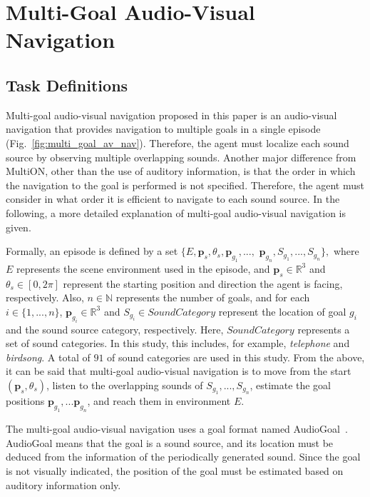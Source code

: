 \section{Multi-Goal Audio-Visual Navigation}

\subsection{Task Definitions}


Multi-goal audio-visual navigation proposed in this paper is an audio-visual navigation that provides navigation to multiple goals in a single episode (Fig.~\ref{fig:multi_goal_av_nav}).
Therefore, the agent must localize each sound source by observing multiple overlapping sounds.
Another major difference from MultiON, other than the use of auditory information, is that the order in which the navigation to the goal is performed is not specified.
Therefore, the agent must consider in what order it is efficient to navigate to each sound source.
In the following, a more detailed explanation of multi-goal audio-visual navigation is given.

Formally, an episode is defined by a set
$
\{E, \bm{p}_s, \theta_s, \bm{p}_{g_1}, ... , 
$
$
\bm{p}_{g_n}, S_{g_1}, ... , S_{g_n}\},
$
where $E$ represents the scene environment used in the episode, and $\bm{p}_s \in \mathbb{R}^3$ and $\theta_s \in [0, 2\pi]$ represent the starting position and direction the agent is facing, respectively.
Also, $n \in \mathbb{N}$ represents the number of goals, and for each $i \in \{1, ... , n\}$, $\bm{p}_{g_i} \in \mathbb{R}^3$ and $S_{g_i} \in SoundCategory$ represent the location of goal $g_i$ and the sound source category, respectively.
Here, $SoundCategory$ represents a set of sound categories. 
In this study, this includes, for example, \textit{telephone} and \textit{birdsong}.
A total of $91$ of sound categories are used in this study.
From the above, it can be said that multi-goal audio-visual navigation is to move from the start $(\bm{p}_s, \theta_s)$, listen to the overlapping sounds of $S_{g_1}, ..., S_{g_n}$, estimate the goal positions $\bm{p}_{g_1}, ... \bm{p}_{g_n}$, and reach them in environment $E$.

The multi-goal audio-visual navigation uses a goal format named AudioGoal~\cite{chen2020soundspaces}.
AudioGoal means that the goal is a sound source, and its location must be deduced from the information of the periodically generated sound.
Since the goal is not visually indicated, the position of the goal must be estimated based on auditory information only.

